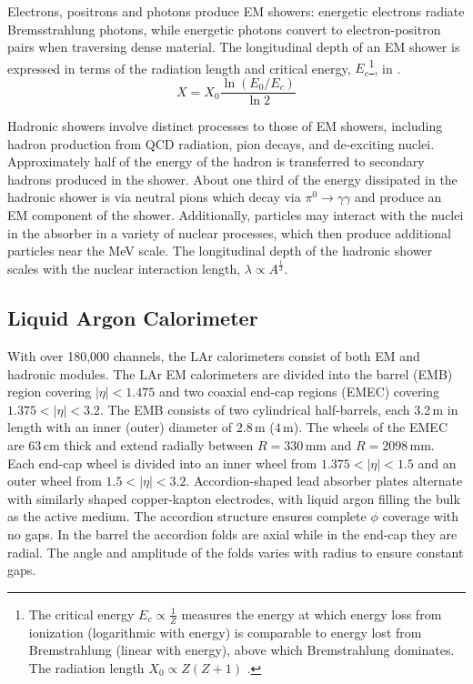 Electrons, positrons and photons produce EM showers: energetic electrons radiate Bremsstrahlung photons, while energetic photons convert to electron-positron pairs when traversing dense material. The longitudinal depth of an EM shower is expressed in terms of the radiation length and critical energy, $E_c$\footnote{
	The critical energy $E_c\propto \frac{1}{Z}$ measures the energy at which energy loss from ionization (logarithmic with energy) is comparable to energy lost from Bremstrahlung (linear with energy), above which Bremstrahlung dominates. The radiation length $X_0\propto Z(Z+1)$ \cite{pdg_2017}. 
}, in \Eqn{\ref{eq:x0}}.
\begin{equation}
	X = X_0\frac{\ln\left(E_0/E_c\right)}{\ln 2}
	\label{eq:x0}
\end{equation}

Hadronic showers involve distinct processes to those of EM showers, including hadron production from QCD radiation, pion decays, and de-exciting nuclei. Approximately half of the energy of the hadron is transferred to secondary hadrons produced in the shower. About one third of the energy dissipated in the hadronic shower is via neutral pions which decay via $\pi^0\to\gamma\gamma$ and produce an EM component of the shower. Additionally, particles may interact with the nuclei in the absorber in a variety of nuclear processes, which then produce additional particles near the MeV scale.  The longitudinal depth of the hadronic shower scales with the nuclear interaction length, $\lambda\propto A^{\frac{1}{3}}$. 


%
\subsection{Liquid Argon Calorimeter}

With over 180,000 channels, the LAr calorimeters consist of both EM and hadronic modules. The LAr EM calorimeters are divided into the barrel (EMB) region covering $|\eta|<1.475$ and two coaxial end-cap regions (EMEC) covering $1.375<|\eta|<3.2$. The EMB consists of two cylindrical half-barrels, each 3.2\,m in length with an inner (outer) diameter of $2.8$\,m ($4$\,m). The wheels of the EMEC are 63\,cm thick and extend radially between $R=330$\,mm and $R=2098$\,mm.  Each end-cap wheel is divided into an inner wheel from $1.375<|\eta|<1.5$ and an outer wheel from $1.5<|\eta|<3.2$. Accordion-shaped lead absorber plates alternate with similarly shaped copper-kapton electrodes, with liquid argon filling the bulk as the active medium. The accordion structure ensures complete $\phi$ coverage with no gaps. In the barrel the accordion folds are axial while in the end-cap they are radial. The angle and amplitude of the folds varies with radius to ensure constant gaps.

